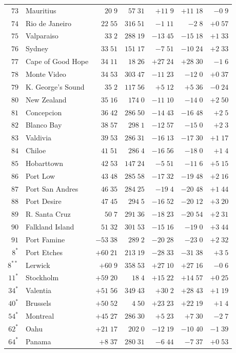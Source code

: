 \begin{center}
\begin{tabular}{rl|r|r||r|r|r}
$73$&Mauritius&$20\;9$&$57\;31$&$+11\;9$&$+11\;18$&$-0\;9$\\
$74$&Rio de Janeiro&$22\;55$&$316\;51$&$-1\;11$&$-2\;8$&$+0\;57$\\
$75$&Valparaiso&$33\;2$&$288\;19$&$-13\;45$&$-15\;18$&$+1\;33$\\
$76$&Sydney&$33\;51$&$151\;17$&$-7\;51$&$-10\;24$&$+2\;33$\\
$77$&Cape of Good Hope&$34\;11$&$18\;26$&$+27\;24$&$+28\;30$&$-1\;6$\\
$78$&Monte Video&$34\;53$&$303\;47$&$-11\;23$&$-12\;0$&$+0\;37$\\
$79$&K. George's Sound&$35\;2$&$117\;56$&$+5\;12$&$+5\;36$&$-0\;24$\\
$80$&New Zealand&$35\;16$&$174\;0$&$-11\;10$&$-14\;0$&$+2\;50$\\[2pt]
$81$&Concepcion&$36\;42$&$286\;50$&$-14\;43$&$-16\;48$&$+2\;5$\\
$82$&Blanco Bay&$38\;57$&$298\;1$&$-12\;57$&$-15\;0$&$+2\;3$\\
$83$&Valdivia&$39\;53$&$286\;31$&$-16\;13$&$-17\;30$&$+1\;17$\\
$84$&Chiloe&$41\;51$&$286\;4$&$-16\;56$&$-18\;0$&$+1\;4$\\
$85$&Hobarttown&$42\;53$&$147\;24$&$-5\;51$&$-11\;6$&$+5\;15$\\
$86$&Port Low&$43\;48$&$285\;58$&$-17\;32$&$-19\;48$&$+2\;16$\\
$87$&Port San Andres&$46\;35$&$284\;25$&$-19\;4$&$-20\;48$&$+1\;44$\\
$88$&Port Desire&$47\;45$&$294\;5$&$-16\;52$&$-20\;12$&$+3\;20$\\
$89$&R. Santa Cruz&$50\;7$&$291\;36$&$-18\;23$&$-20\;54$&$+2\;31$\\
$90$&Falkland Island&$51\;32$&$301\;53$&$-15\;16$&$-19\;0$&$+3\;44$\\[2pt]
$91$&Port Famine&$-53\;38$&$289\;2$&$-20\;28$&$-23\;0$&$+2\;32$\\[2pt]
$8^{\ast}$&Port Etches&$+60\;21$&$213\;19$&$-28\;33$&$-31\;38$&$+3\;5$\\
$8^{\ast\ast}$&Lerwick&$+60\;9$&$358\;53$&$+27\;10$&$+27\;16$&$-0\;6$\\
$11^{\ast}$&Stockholm&$+59\;20$&$18\;4$&$+15\;22$&$+14\;57$&$+0\;25$\\
$34^{\ast}$&Valentia&$+51\;56$&$349\;43$&$+30\;2$&$+28\;43$&$+1\;19$\\
$40^{\ast}$&Brussels&$+50\;52$&$4\;50$&$+23\;23$&$+22\;19$&$+1\;4$\\
$54^{\ast}$&Montreal&$+45\;27$&$286\;30$&$+5\;23$&$+7\;30$&$-2\;7$\\
$62^{\ast}$&Oahu&$+21\;17$&$202\;0$&$-12\;19$&$-10\;40$&$-1\;39$\\
$64^{\ast}$&Panama&$+8\;37$&$280\;31$&$-6\;44$&$-7\;37$&$+0\;53$\\
\hline
\end{tabular}
\end{center}
\endgroup

